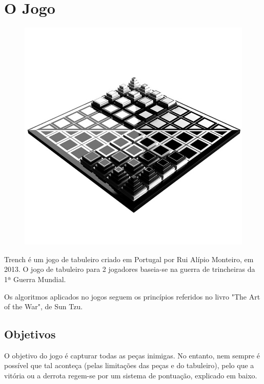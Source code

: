 \section{O Jogo}

\begin{figure}[h!]
\begin{center}
\includegraphics[scale=0.3]{img/game-cover.jpg}
\label{fig:0}
\end{center}
\end{figure}

Trench é um jogo de tabuleiro criado em Portugal por Rui Alípio Monteiro, em 2013.
O jogo de tabuleiro para 2 jogadores baseia-se na guerra de trincheiras da 1ª Guerra Mundial.

Os algoritmos aplicados no jogos seguem os princípios referidos no livro "The Art of the War", de Sun Tzu.

\subsection{Objetivos}

O objetivo do jogo é capturar todas as peças inimigas.
No entanto, nem sempre é possível que tal aconteça (pelas limitações das peças e do tabuleiro), pelo que a vitória ou a derrota regem-se por um sistema de pontuação, explicado em baixo.

